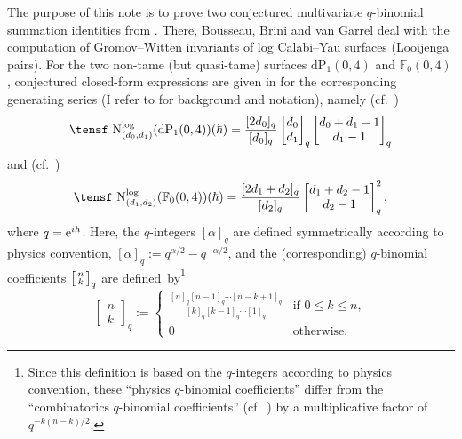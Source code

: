 \documentclass[pdftex]{sigma}
\def\al{\alpha}
\begin{document}
\medskip


\renewcommand{\thefootnote}{\arabic{footnote}}
\setcounter{footnote}{0}

The purpose of this note is to prove two conjectured multivariate
$q$-binomial summation identities from \cite{BoBGAA}. There,
Bousseau, Brini and van Garrel deal with the computation of
Gromov--Witten invariants of log Calabi--Yau surfaces (Looijenga pairs).
For the two non-tame (but quasi-tame) surfaces $\text{dP}_1(0,4)$
and $\mathbb F_0(0,4)$, conjectured closed-form expressions are given
in \cite{BoBGAA} for the
corresponding generating series
(I refer to \cite{BoBGAA} for background and notation), namely
(cf.~\mbox{\cite[Conjecture~B.3, equation~(B-2)]{BoBGAA}})
\begin{equation} \label{AA}
\text{\tensf N}_{(d_0,d_1)}^{\log}(\text{dP}_1(0,4))(\hbar)
=
\frac {[2d_0]_q} {[d_0]_q}
\begin{bmatrix} d_0\\d_1\end{bmatrix}_q
\begin{bmatrix} d_0+d_1-1\\d_1-1\end{bmatrix}_q
\end{equation}
and (cf.~\cite[Conjecture~B.3, equation~(B-3)]{BoBGAA})
\begin{equation} \label{AB}
\text{\tensf N}_{(d_1,d_2)}^{\log}(\mathbb F_0(0,4))(\hbar)
=
\frac {[2d_1+d_2]_q} {[d_2]_q}\begin{bmatrix} d_1+d_2-1\\d_2-1\end{bmatrix}_q^2,
\end{equation}
where $q={\rm e}^{i\hbar}$.
Here, the $q$-integers $[\al]_q$ are defined symmetrically according
to physics convention, $[\al]_q:=q^{\al/2}-q^{-\al/2}$, and
the (corresponding) $q$-binomial coefficients
$\bigl[\smallmatrix n\\k\endsmallmatrix\bigr]_q$ are defined~by\footnote{Since this definition is based on the
$q$-integers according to physics convention,
these ``physics $q$-binomial coefficients'' differ
from the ``combinatorics $q$-binomial coefficients'' (cf.\
\cite[Exercise~1.2]{GaRaAF})
by a multiplicative factor of~${q^{-k(n-k)/2}}$.}
\begin{equation*}
\begin{bmatrix} n\\k\end{bmatrix}_q:=\begin{cases} \displaystyle
\frac {[n]_q[n-1]_q\cdots[n-k+1]_q} {[k]_q[k-1]_q\cdots[1]_q}
&\text{if }0\le k\le n,\\
0&\text{otherwise.}\end{cases}
\end{equation*}
\end{document}
